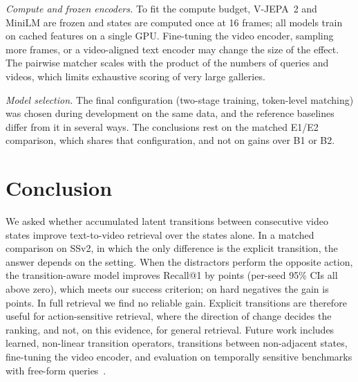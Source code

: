 \documentclass[lettersize,journal]{IEEEtran}
\begin{document}
\emph{Compute and frozen encoders.} To fit the compute budget, V-JEPA~2 and
MiniLM are frozen and states are computed once at 16 frames; all models train on
cached features on a single GPU. Fine-tuning the video encoder, sampling more
frames, or a video-aligned text encoder may change the size of the effect. The
pairwise matcher scales with the product of the numbers of queries and videos,
which limits exhaustive scoring of very large galleries.

\emph{Model selection.} The final configuration (two-stage training,
token-level matching) was chosen during development on the same data, and the
reference baselines differ from it in several ways. The conclusions rest on the
matched E1/E2 comparison, which shares that configuration, and not on gains over
B1 or B2.

\section{Conclusion}
We asked whether accumulated latent transitions between consecutive video
states improve text-to-video retrieval over the states alone. In a matched
comparison on SSv2, in which the only difference is the explicit transition,
the answer depends on the setting. When the distractors perform the opposite
action, the transition-aware model improves Recall@1 by \DeltaAcRone{} points
(per-seed 95\% CIs all above zero),
which meets our success criterion; on hard negatives the gain is
\DeltaHnRone{} points. In full retrieval we find no reliable gain. Explicit
transitions are therefore useful for action-sensitive retrieval, where the
direction of change decides the ranking, and not, on this evidence, for general
retrieval. Future work includes learned, non-linear transition operators,
transitions between non-adjacent states, fine-tuning the video encoder, and
evaluation on temporally sensitive benchmarks with free-form
queries~\cite{bagad2023testoftime,sigurdsson2016charades,hendricks2017didemo}.
\end{document}
